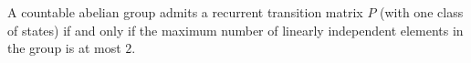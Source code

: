 A countable abelian group admits a recurrent transition matrix $P$ (with one class of states) if and only if the maximum number of linearly independent elements in the group is at most $2$.
